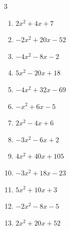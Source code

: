 \begin{multicols}{3}
\begin{enumerate}
  \item $2x^{2}+4x+7$


  \item $-2x^{2}+20x-52$


  \item $-4x^{2}-8x-2$


  \item $5x^{2}-20x+18$


  \item $-4x^{2}+32x-69$


  \item $-x^{2}+6x-5$


  \item $2x^{2}-4x+6$


  \item $-3x^{2}-6x+2$


  \item $4x^{2}+40x+105$


  \item $-3x^{2}+18x-23$


\columnbreak %

\resetques

  \item $5x^{2}+10x+3$


  \item $-2x^{2}-8x-5$


  \item $2x^{2}+20x+52$



\end{enumerate}
\end{multicols}
